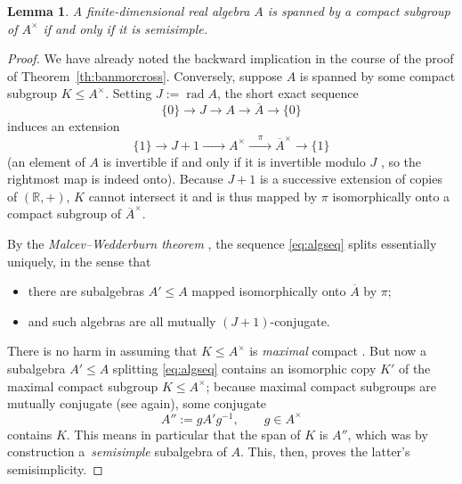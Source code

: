 \documentclass[pdftex]{sigma}
\numberwithin{equation}{section}
\newtheorem{Lemma}[Theorem]{Lemma}
\newcommand\bR{{\mathbb R}}
\begin{document}
\begin{Lemma}\label{le:mustbess}
 A finite-dimensional real algebra $A$ is spanned by a compact subgroup of $A^{\times}$ if and only if it is semisimple.
\end{Lemma}
\begin{proof}
 We have already noted the backward implication in the course of the proof of Theorem~\ref{th:banmorcross}. Conversely, suppose $A$ is spanned by some compact subgroup $K\le A^{\times}$. Setting $J:=\operatorname{rad}A$, the short exact sequence
 \begin{equation}\label{eq:algseq}
 \{0\}\to J\xrightarrow{\quad}A\xrightarrow{\quad}\overline{A}\to \{0\}
 \end{equation}
 induces an extension
 \begin{equation*}
 \{1\}\to J+1\xrightarrow{\quad\phantom{\pi}\quad} A^{\times}\xrightarrow{\quad\pi\quad} \overline{A}^{\times}\to \{1\}
 \end{equation*}
 (an element of $A$ is invertible if and only if it is invertible modulo $J$ \cite[Proposition 4.8]{lam}, so the rightmost map is indeed onto). Because $J+1$ is a successive extension of copies of $(\bR,+)$, $K$ cannot intersect it and is thus mapped by $\pi$ isomorphically onto a compact subgroup of $\overline{A}^{\times}$.

 By the {\it Malcev--Wedderburn theorem} \cite[Section~11.6, Theorem]{pierce}, the sequence \eqref{eq:algseq} splits essentially uniquely, in the sense that
 \begin{itemize}\itemsep=0pt
 \item there are subalgebras $A'\le A$ mapped isomorphically onto $\overline{A}$ by $\pi$;
 \item and such algebras are all mutually $(J+1)$-conjugate.
 \end{itemize}
 There is no harm in assuming that $K\le A^{\times}$ is {\it maximal} compact \cite[Theorem~VII.1.2]{bor-symsp}. But now a subalgebra $A'\le A$ splitting \eqref{eq:algseq} contains an isomorphic copy $K'$ of the maximal compact subgroup $K\le A^{\times}$; because maximal compact subgroups are mutually conjugate (see \cite[Theorem~VII.1.2]{bor-symsp} again), some conjugate
 \begin{equation*}
 A'':=gA'g^{-1},\qquad g\in A^{\times}
 \end{equation*}
 contains $K$. This means in particular that the span of $K$ is $A''$, which was by construction a~{\it semisimple} subalgebra of $A$. This, then, proves the latter's semisimplicity.
\end{proof}
\end{document}
